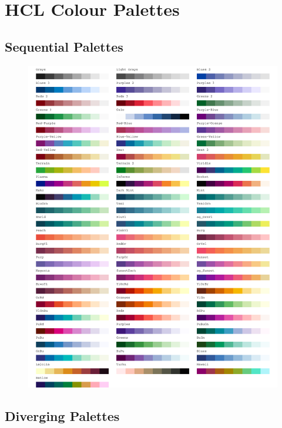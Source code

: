 \chapter{HCL Colour Palettes}
\label{sec:AppendixPalettes}

\newpage

\section{Sequential Palettes}

\begin{figure}[H]
\centering
\includegraphics[width = \textwidth]{graphics/appFigs/hcl_pals_seq.pdf}
\end{figure}

\section{Diverging Palettes}

